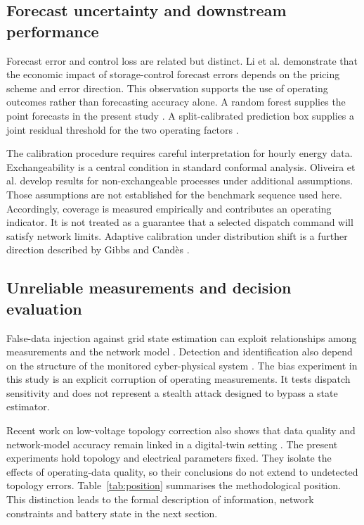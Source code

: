 \documentclass[11pt,a4paper]{article}
\begin{document}
\subsection{Forecast uncertainty and downstream performance}
Forecast error and control loss are related but distinct. Li et al. \cite{li} demonstrate that the economic impact of storage-control forecast errors depends on the pricing scheme and error direction. This observation supports the use of operating outcomes rather than forecasting accuracy alone. A random forest supplies the point forecasts in the present study \cite{breiman}. A split-calibrated prediction box supplies a joint residual threshold for the two operating factors \cite{angelopoulos}.

The calibration procedure requires careful interpretation for hourly energy data. Exchangeability is a central condition in standard conformal analysis. Oliveira et al. \cite{oliveira} develop results for non-exchangeable processes under additional assumptions. Those assumptions are not established for the benchmark sequence used here. Accordingly, coverage is measured empirically and contributes an operating indicator. It is not treated as a guarantee that a selected dispatch command will satisfy network limits. Adaptive calibration under distribution shift is a further direction described by Gibbs and Cand\`es \cite{gibbs}.

\subsection{Unreliable measurements and decision evaluation}
False-data injection against grid state estimation can exploit relationships among measurements and the network model \cite{liu}. Detection and identification also depend on the structure of the monitored cyber-physical system \cite{pasqualetti}. The bias experiment in this study is an explicit corruption of operating measurements. It tests dispatch sensitivity and does not represent a stealth attack designed to bypass a state estimator.

Recent work on low-voltage topology correction also shows that data quality and network-model accuracy remain linked in a digital-twin setting \cite{dongliu}. The present experiments hold topology and electrical parameters fixed. They isolate the effects of operating-data quality, so their conclusions do not extend to undetected topology errors. Table~\ref{tab:position} summarises the methodological position. This distinction leads to the formal description of information, network constraints and battery state in the next section.
\end{document}
